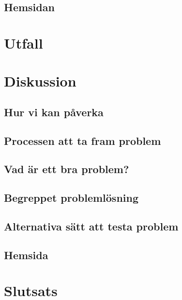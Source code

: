 \documentclass[11pt,a4paper]{article}
\begin{document}
    \subsection{Hemsidan}
        

\section{Utfall}
    \label{sec:Utfall}
    

\section{Diskussion}

    \subsection{Hur vi kan påverka}
        
    
    \subsection{Processen att ta fram problem}
        
    
    \subsection{Vad är ett bra problem?}
        
        
    \subsection{Begreppet problemlösning}
        
        
    \subsection{Alternativa sätt att testa problem}
        
    
    \subsection{Hemsida}
        

\section{Slutsats}

\newpage
\begin{thebibliography}{3}
    
\end{thebibliography}
\end{document}

